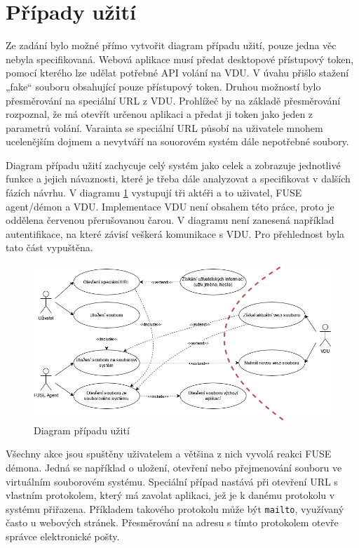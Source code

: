 \section{Případy užití}

Ze zadání bylo možné přímo vytvořit diagram případu užití, pouze jedna věc nebyla specifikovaná. Webová aplikace musí předat desktopové přístupový token, 
pomocí kterého lze udělat potřebné API volání na VDU. V úvahu přišlo stažení „fake“ souboru obsahující pouze přístupový token. Druhou možností bylo
přesměrování na speciální URL z VDU. Prohlížeč by na základě přesměrování rozpoznal, že má otevřít určenou aplikaci a předat ji token jako jeden z
parametrů volání. Varainta se speciální URL působí na uživatele mnohem ucelenějším dojmem a nevytváří na souorovém systém dále nepotřebné soubory.

Diagram případu užití zachycuje celý systém jako celek a zobrazuje jednotlivé funkce a jejich návaznosti, které je třeba dále analyzovat a specifikovat v dalších
fázích návrhu. V diagramu \ref{fig:use_case} vystupují tři aktéři a to uživatel, FUSE agent/démon a VDU. Implementace VDU není obsahem této práce, proto je oddělena červenou
přerušovanou čarou. V diagramu není zanesená například autentifikace, na které závisí veškerá komunikace s VDU. Pro přehlednost byla tato část vypuštěna.

\begin{figure}[h]
    \centering    
    \includegraphics[width=1\linewidth]{other-fig/use_case_diagram.png}
    \caption{Diagram případu užití}
    \label{fig:use_case}
\end{figure}


Všechny akce jsou spuštěny uživatelem a většina z nich vyvolá reakci FUSE démona. Jedná se například o uložení, otevření nebo přejmenování souboru ve virtuálním souborovém
systému. Speciální případ nastává při otevření URL s vlastním protokolem, který má zavolat aplikaci, jež je k danému protokolu v systému přiřazena. Příkladem takového
protokolu může být \texttt{mailto}, využívaný často u webových stránek. Přesměrování na adresu s tímto protokolem otevře správce elektronické pošty. 

